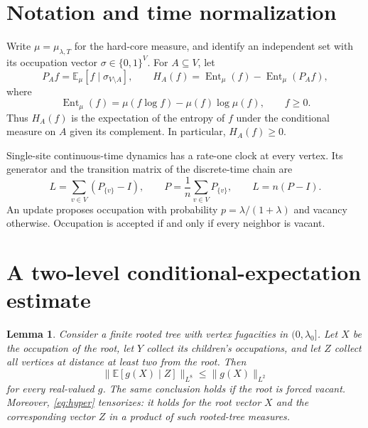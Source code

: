 \documentclass[11pt]{article}
\newtheorem{lemma}[theorem]{Lemma}
\newcommand{\E}{\mathbb E}
\newcommand{\Ent}{\operatorname{Ent}}
\begin{document}
\section{Notation and time normalization}

Write $\mu=\mu_{\lambda,T}$ for the hard-core measure, and identify an independent set with its occupation vector $\sigma\in\{0,1\}^V$. For $A\subseteq V$, let
\[
P_A f=\E_\mu[f\mid\sigma_{V\setminus A}],\qquad
H_A(f)=\Ent_\mu(f)-\Ent_\mu(P_Af),
\]
where
\[
\Ent_\mu(f)=\mu(f\log f)-\mu(f)\log\mu(f),\qquad f\ge0.
\]
Thus $H_A(f)$ is the expectation of the entropy of $f$ under the conditional measure on $A$ given its complement. In particular, $H_A(f)\ge0$.

Single-site continuous-time dynamics has a rate-one clock at every vertex. Its generator and the transition matrix of the discrete-time chain are
\[
L=\sum_{v\in V}(P_{\{v\}}-I),\qquad
P=\frac1n\sum_{v\in V}P_{\{v\}},\qquad L=n(P-I).
\]
An update proposes occupation with probability $p=\lambda/(1+\lambda)$ and vacancy otherwise. Occupation is accepted if and only if every neighbor is vacant.

\section{A two-level conditional-expectation estimate}

\begin{lemma}\label{lem:hyper}
Consider a finite rooted tree with vertex fugacities in $(0,\lambda_0]$. Let $X$ be the occupation of the root, let $Y$ collect its children's occupations, and let $Z$ collect all vertices at distance at least two from the root. Then
\begin{equation}\label{eq:hyper}
\big\|\E[g(X)\mid Z]\big\|_{L^8}\le\|g(X)\|_{L^2}
\end{equation}
for every real-valued $g$. The same conclusion holds if the root is forced vacant.
Moreover, \eqref{eq:hyper} tensorizes: it holds for the root vector $X$ and the corresponding vector $Z$ in a product of such rooted-tree measures.
\end{lemma}
\end{document}
